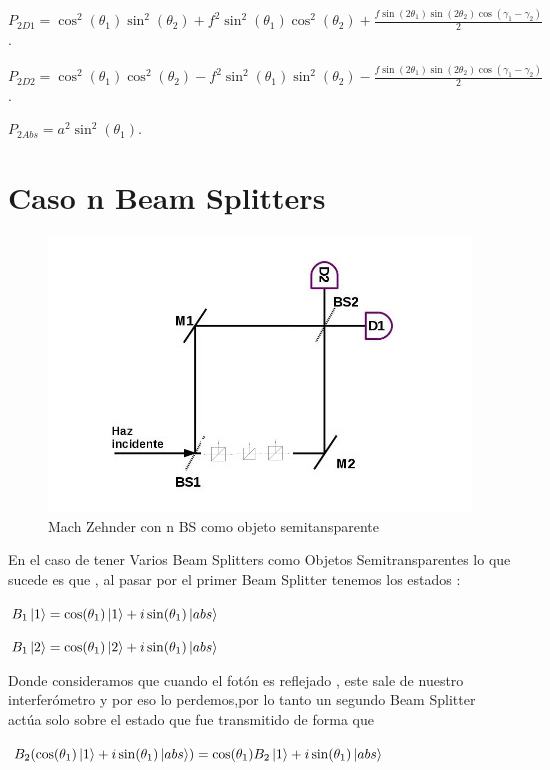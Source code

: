 \documentclass[11pt]{article}
\begin{document}
\vspace{5cm}
$P_
{2D1}=\cos^2(\theta_
{1})\sin^2(\theta_
{2})+f^2 \sin^2(\theta_
{1})\cos^2(\theta_
{2})+\frac{f \sin(2\theta_
{1})\sin(2\theta_
{2})\cos
(\gamma_{1}-\gamma_{2})}{2}$.

$P_
{2D2}=\cos^2(\theta_
{1})\cos^2(\theta_
{2})- f^2 \sin^2(\theta_
{1})\sin^2(\theta_
{2})-\frac{f \sin(2\theta_
{1})\sin(2\theta_
{2})\cos
(\gamma_{1}-\gamma_{2})}{2}$.

$P_
{2Abs}=a^2 \sin^2(\theta_
{1})$.


\section{Caso n Beam Splitters }
\vspace{1 cm}
\begin{figure}[h!]
\centering
\includegraphics[width=\linewidth]{machzenhderBSS.jpg}
\caption{Mach Zehnder con n BS como objeto semitansparente}
\label{fig:BS2}
\end{figure}

En el caso de tener Varios Beam Splitters como Objetos Semitransparentes lo que sucede es que , al pasar por el primer Beam Splitter tenemos los estados :


$B_{1}\ket{1}=\cos(\theta_{1})\ket{1}+i\sin(\theta_{1})\ket{abs}$

$B_{1}\ket{2}=\cos(\theta_{1})\ket{2}+i\sin(\theta_{1})\ket{abs}$

Donde consideramos que cuando el fotón es reflejado , este sale de nuestro interferómetro y por eso lo perdemos,por lo tanto un segundo Beam Splitter actúa solo sobre el estado que fue transmitido de forma que 

$B_{2}(\cos(\theta_{1})\ket{1}+i\sin(\theta_{1})\ket{abs})=\cos(\theta_{1})B_{2}\ket{1}+i\sin(\theta_{1})\ket{abs}$
\end{document}
